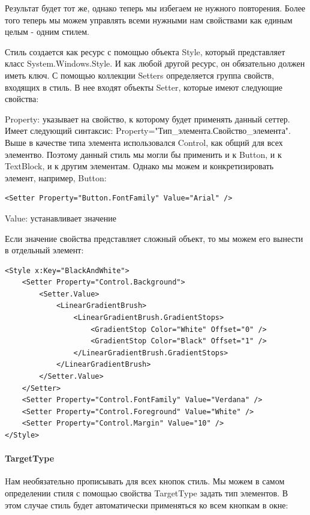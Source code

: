 Результат будет тот же, однако теперь мы избегаем не нужного повторения. Более того теперь мы можем управлять всеми нужными нам свойствами как единым целым - одним стилем.

Стиль создается как ресурс с помощью объекта Style, который представляет класс System.Windows.Style. И как любой другой ресурс, он обязательно должен иметь ключ. С помощью коллекции Setters определяется группа свойств, входящих в стиль. В нее входят объекты Setter, которые имеют следующие свойства:

Property: указывает на свойство, к которому будет применять данный сеттер. Имеет следующий синтаксис: Property="Тип\_элемента.Свойство\_элемента". Выше в качестве типа элемента использовался Control, как общий для всех элементво. Поэтому данный стиль мы могли бы применить и к Button, и к TextBlock, и к другим элементам. Однако мы можем и конкретизировать элемент, например, Button:

\begin{verbatim}
<Setter Property="Button.FontFamily" Value="Arial" />
\end{verbatim}

Value: устанавливает значение

Если значение свойства представляет сложный объект, то мы можем его вынести в отдельный элемент:

\begin{verbatim}
<Style x:Key="BlackAndWhite">
    <Setter Property="Control.Background">
        <Setter.Value>
            <LinearGradientBrush>
                <LinearGradientBrush.GradientStops>
                    <GradientStop Color="White" Offset="0" />
                    <GradientStop Color="Black" Offset="1" />
                </LinearGradientBrush.GradientStops>
            </LinearGradientBrush>
        </Setter.Value>
    </Setter>
    <Setter Property="Control.FontFamily" Value="Verdana" />
    <Setter Property="Control.Foreground" Value="White" />
    <Setter Property="Control.Margin" Value="10" />
</Style>
\end{verbatim}


\paragraph{TargetType}
Hам необязательно прописывать для всех кнопок стиль. Мы можем в самом определении стиля с помощью свойства TargetType задать тип элементов. В этом случае стиль будет автоматически применяться ко всем кнопкам в окне:

